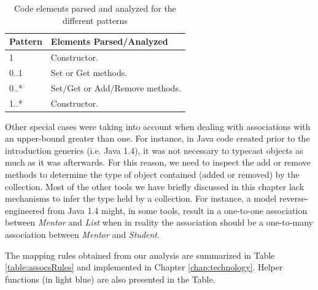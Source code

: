 \begin{table}
\caption{Code elements parsed and analyzed for the different patterns}
\label{table:patternsElements}
\centering
    \begin{tabular}{ll}
		\toprule
		\rowcolor[HTML]{BBDAFF}
        \textbf{Pattern}   & \textbf{Elements Parsed/Analyzed}   \\ 
        \hline
		1  &     Constructor. \\ 
		0..1 &  Set or Get methods. \\ 
		0..* &  Set/Get or Add/Remove methods.\\ 
		1..*  & Constructor.\\ 
        \hline
    \end{tabular}
\end{table}

Other special cases were taking into account when dealing with associations with an upper-bound greater than one. For instance, in Java code created prior to the introduction generics (i.e. Java 1.4), it was not necessary to typecast  objects as much as it was afterwards. For this reason, we need to inspect the add or remove methods to determine the type of object contained (added or removed) by the collection. Most of the other tools we have briefly discussed in this chapter lack mechanisms to infer the type held by a collection.
For instance, a model reverse-engineered from Java 1.4 might, in some tools, result in a one-to-one association between \textit{Mentor} and \textit{List} when in reality the association should be a one-to-many association between \textit{Mentor} and \textit{Student}.

The mapping rules obtained from our analysis are summarized in Table \ref{table:assocsRules} and implemented in Chapter \ref{chap:technology}. Helper functions (in light blue) are also presented in the Table. 

